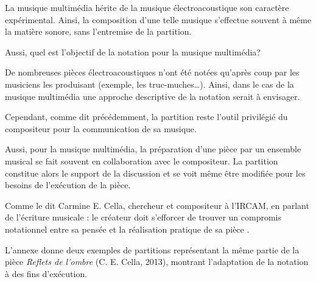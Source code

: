 La musique multimédia hérite de la musique électroacoustique son caractère expérimental. Ainsi, la composition d'une telle musique s'effectue souvent à même la matière sonore, sans l'entremise de la partition.

Aussi, quel est l'objectif de la notation pour la musique multimédia?

De nombreuses pièces électroacoustiques n'ont été notées qu'après coup par les musiciens les produisant (exemple, les truc-muches…). Ainsi, dans le cas de la musique multimédia une approche descriptive de la notation serait à envisager.

Cependant, comme dit précédemment, la partition reste l'outil privilégié du compositeur pour la communication de sa musique.

Aussi, pour la musique multimédia, la préparation d'une pièce par un ensemble musical se fait souvent en collaboration avec le compositeur. La partition constitue alors le support de la discussion et se voit même être modifiée pour les besoins de l'exécution de la pièce. 

Comme le dit Carmine E. Cella, chercheur et compositeur à l'IRCAM, en parlant de l'écriture musicale : \og le créateur doit s'efforcer de trouver un compromis notationnel entre sa pensée et la réalisation pratique de sa pièce \fg.

L'annexe donne deux exemples de partitions représentant la même partie de la pièce \textit{Reflets de l'ombre} (C. E. Cella, 2013), montrant l'adaptation de la notation à des fins d'exécution.

